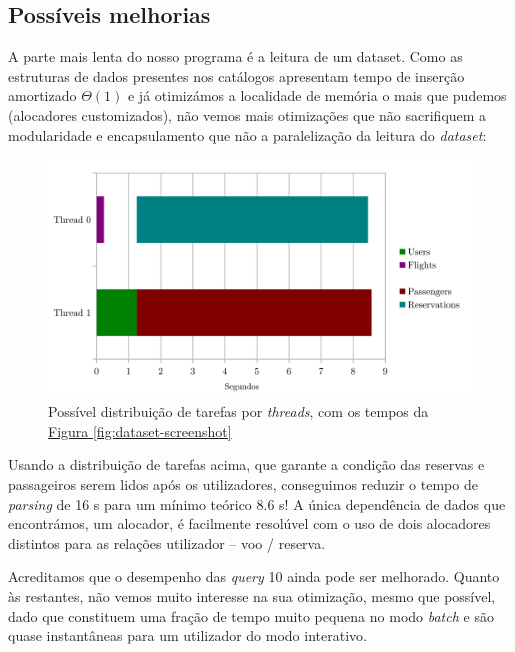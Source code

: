 \documentclass[11pt, a4paper]{article}
\begin{document}

\subsection{Possíveis melhorias}
\label{sec:possible-performance-improvements}

A parte mais lenta do nosso programa é a leitura de um dataset. Como as estruturas de dados
presentes nos catálogos apresentam tempo de inserção amortizado $\Theta(1)$ e já otimizámos a
localidade de memória o mais que pudemos (alocadores customizados), não vemos mais otimizações que
não sacrifiquem a modularidade e encapsulamento que não a paralelização da leitura do
\emph{dataset}:

\begin{figure}[h]
    \centering
    \includegraphics[scale=0.20]{res-fase2/threading.png}
    \caption{Possível distribuição de tarefas por \emph{threads}, com os tempos da
             \hyperref[fig:dataset-screenshot]{Figura \ref*{fig:dataset-screenshot}}}
    \label{fig:threading}
\end{figure}

Usando a distribuição de tarefas acima, que garante a condição das reservas e passageiros serem
lidos após os utilizadores, conseguimos reduzir o tempo de \emph{parsing} de 16 s para um mínimo
teórico 8.6 s! A única dependência de dados que encontrámos, um alocador, é facilmente resolúvel
com o uso de dois alocadores distintos para as relações utilizador -- voo / reserva.

Acreditamos que o desempenho das \emph{query} 10 ainda pode ser melhorado. Quanto às restantes,
não vemos muito interesse na sua otimização, mesmo que possível, dado que constituem uma fração de
tempo muito pequena no modo \emph{batch} e são quase instantâneas para um utilizador do modo
interativo.
\end{document}
